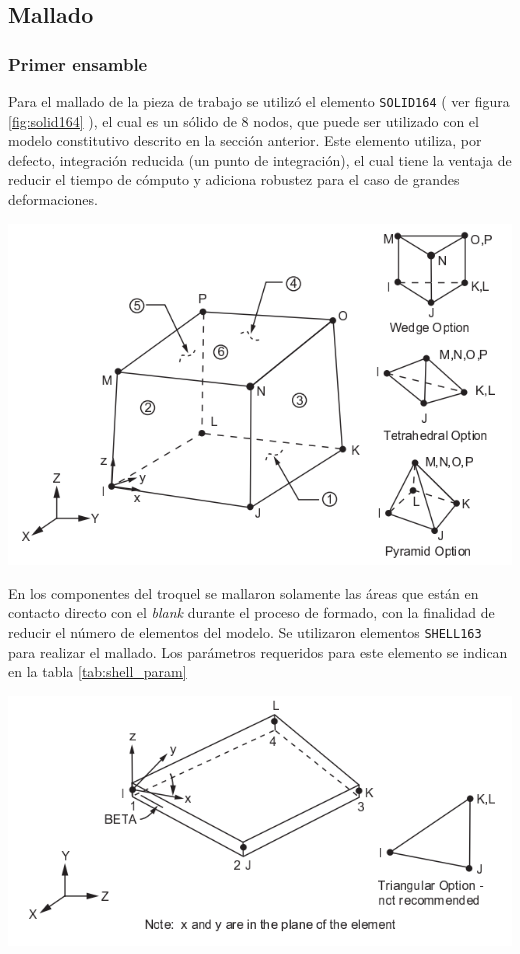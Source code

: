 \subsection{Mallado}

\subsubsection{Primer ensamble}

Para el mallado de la pieza de trabajo se utilizó el elemento \texttt{SOLID164} 
( ver figura \ref{fig:solid164} ), el cual es un sólido de 8 nodos, que puede ser utilizado con el modelo 
constitutivo descrito en la sección anterior. Este elemento utiliza, por defecto, integración reducida 
(un punto de integración), el cual tiene la ventaja de reducir el tiempo de cómputo y adiciona 
robustez para el caso de grandes deformaciones. ~\cite{lsdyna-ansys-manual}

\begin{center}
\includegraphics[scale=0.65]{src/ch3/solid164.png}
\label{fig:solid164}
\end{center}

En los componentes del troquel se mallaron solamente las áreas que están en contacto directo con el 
\textit{blank} durante el proceso de formado, con la finalidad de reducir el número de elementos del modelo. 
Se utilizaron elementos \texttt{SHELL163} para realizar el mallado. Los parámetros requeridos para 
este elemento se indican en la tabla \ref{tab:shell_param}

\begin{center}
\includegraphics[scale=0.65]{src/ch3/shell163.png}
\label{fig:shell163}
\end{center}


